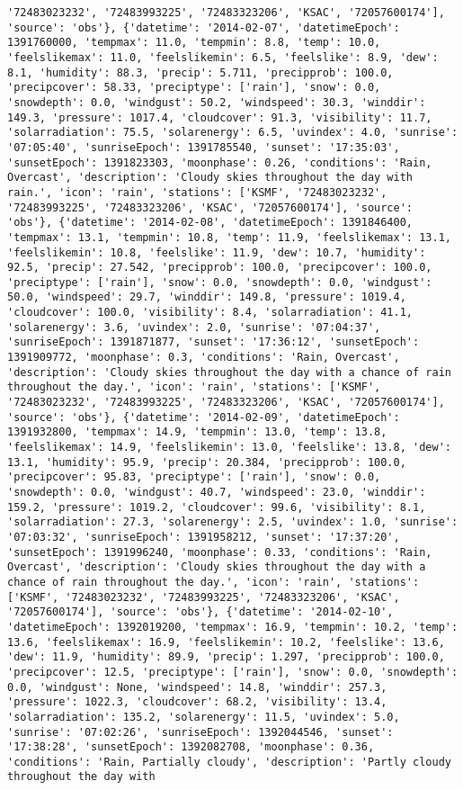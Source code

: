 \documentclass[
  letterpaper,
  DIV=11,
  numbers=noendperiod]{scrartcl}
\begin{document}
\begin{verbatim}
'72483023232', '72483993225', '72483323206', 'KSAC', '72057600174'], 'source': 'obs'}, {'datetime': '2014-02-07', 'datetimeEpoch': 1391760000, 'tempmax': 11.0, 'tempmin': 8.8, 'temp': 10.0, 'feelslikemax': 11.0, 'feelslikemin': 6.5, 'feelslike': 8.9, 'dew': 8.1, 'humidity': 88.3, 'precip': 5.711, 'precipprob': 100.0, 'precipcover': 58.33, 'preciptype': ['rain'], 'snow': 0.0, 'snowdepth': 0.0, 'windgust': 50.2, 'windspeed': 30.3, 'winddir': 149.3, 'pressure': 1017.4, 'cloudcover': 91.3, 'visibility': 11.7, 'solarradiation': 75.5, 'solarenergy': 6.5, 'uvindex': 4.0, 'sunrise': '07:05:40', 'sunriseEpoch': 1391785540, 'sunset': '17:35:03', 'sunsetEpoch': 1391823303, 'moonphase': 0.26, 'conditions': 'Rain, Overcast', 'description': 'Cloudy skies throughout the day with rain.', 'icon': 'rain', 'stations': ['KSMF', '72483023232', '72483993225', '72483323206', 'KSAC', '72057600174'], 'source': 'obs'}, {'datetime': '2014-02-08', 'datetimeEpoch': 1391846400, 'tempmax': 13.1, 'tempmin': 10.8, 'temp': 11.9, 'feelslikemax': 13.1, 'feelslikemin': 10.8, 'feelslike': 11.9, 'dew': 10.7, 'humidity': 92.5, 'precip': 27.542, 'precipprob': 100.0, 'precipcover': 100.0, 'preciptype': ['rain'], 'snow': 0.0, 'snowdepth': 0.0, 'windgust': 50.0, 'windspeed': 29.7, 'winddir': 149.8, 'pressure': 1019.4, 'cloudcover': 100.0, 'visibility': 8.4, 'solarradiation': 41.1, 'solarenergy': 3.6, 'uvindex': 2.0, 'sunrise': '07:04:37', 'sunriseEpoch': 1391871877, 'sunset': '17:36:12', 'sunsetEpoch': 1391909772, 'moonphase': 0.3, 'conditions': 'Rain, Overcast', 'description': 'Cloudy skies throughout the day with a chance of rain throughout the day.', 'icon': 'rain', 'stations': ['KSMF', '72483023232', '72483993225', '72483323206', 'KSAC', '72057600174'], 'source': 'obs'}, {'datetime': '2014-02-09', 'datetimeEpoch': 1391932800, 'tempmax': 14.9, 'tempmin': 13.0, 'temp': 13.8, 'feelslikemax': 14.9, 'feelslikemin': 13.0, 'feelslike': 13.8, 'dew': 13.1, 'humidity': 95.9, 'precip': 20.384, 'precipprob': 100.0, 'precipcover': 95.83, 'preciptype': ['rain'], 'snow': 0.0, 'snowdepth': 0.0, 'windgust': 40.7, 'windspeed': 23.0, 'winddir': 159.2, 'pressure': 1019.2, 'cloudcover': 99.6, 'visibility': 8.1, 'solarradiation': 27.3, 'solarenergy': 2.5, 'uvindex': 1.0, 'sunrise': '07:03:32', 'sunriseEpoch': 1391958212, 'sunset': '17:37:20', 'sunsetEpoch': 1391996240, 'moonphase': 0.33, 'conditions': 'Rain, Overcast', 'description': 'Cloudy skies throughout the day with a chance of rain throughout the day.', 'icon': 'rain', 'stations': ['KSMF', '72483023232', '72483993225', '72483323206', 'KSAC', '72057600174'], 'source': 'obs'}, {'datetime': '2014-02-10', 'datetimeEpoch': 1392019200, 'tempmax': 16.9, 'tempmin': 10.2, 'temp': 13.6, 'feelslikemax': 16.9, 'feelslikemin': 10.2, 'feelslike': 13.6, 'dew': 11.9, 'humidity': 89.9, 'precip': 1.297, 'precipprob': 100.0, 'precipcover': 12.5, 'preciptype': ['rain'], 'snow': 0.0, 'snowdepth': 0.0, 'windgust': None, 'windspeed': 14.8, 'winddir': 257.3, 'pressure': 1022.3, 'cloudcover': 68.2, 'visibility': 13.4, 'solarradiation': 135.2, 'solarenergy': 11.5, 'uvindex': 5.0, 'sunrise': '07:02:26', 'sunriseEpoch': 1392044546, 'sunset': '17:38:28', 'sunsetEpoch': 1392082708, 'moonphase': 0.36, 'conditions': 'Rain, Partially cloudy', 'description': 'Partly cloudy throughout the day with 
\end{verbatim}
\end{document}

